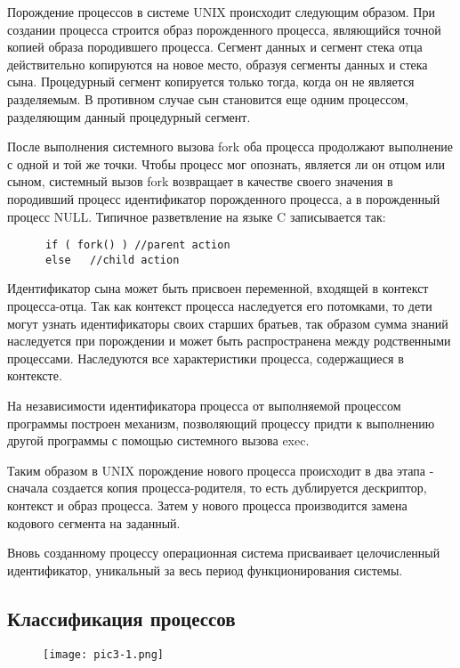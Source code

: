 Порождение процессов в системе UNIX происходит следующим образом. При создании процесса строится образ порожденного процесса, являющийся точной копией образа породившего процесса. Сегмент данных и сегмент стека отца действительно копируются на новое место, образуя сегменты данных и стека сына. Процедурный сегмент копируется только тогда, когда он не является разделяемым. В противном случае сын становится еще одним процессом, разделяющим данный процедурный сегмент.

После выполнения системного вызова fork оба процесса продолжают выполнение с одной и той же точки. Чтобы процесс мог опознать, является ли он отцом или сыном, системный вызов fork возвращает в качестве своего значения в породивший процесс идентификатор порожденного процесса, а в порожденный процесс NULL. Типичное разветвление на языке C записывается так:
\begin{lstlisting}
      if ( fork() ) //parent action
      else   //child action  
\end{lstlisting}

Идентификатор сына может быть присвоен переменной, входящей в контекст процесса-отца. Так как контекст процесса наследуется его потомками, то дети могут узнать идентификаторы своих старших братьев, так образом сумма знаний наследуется при порождении и может быть распространена между родственными процессами. Наследуются все характеристики процесса, содержащиеся в контексте.

На независимости идентификатора процесса от выполняемой процессом программы построен механизм, позволяющий процессу придти к выполнению другой программы с помощью системного вызова exec.

Таким образом в UNIX порождение нового процесса происходит в два этапа - сначала создается копия процесса-родителя, то есть дублируется дескриптор, контекст и образ процесса. Затем у нового процесса производится замена кодового сегмента на заданный.

Вновь созданному процессу операционная система присваивает целочисленный идентификатор, уникальный за весь период функционирования системы.
\subsection{Классификация процессов}

\begin{figure}\center
   \texttt{[image: pic3-1.png]}
\end{figure}

